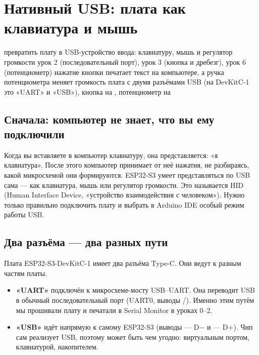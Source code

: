 \section{Нативный USB: плата как клавиатура и мышь}
\lessonintro
  {превратить плату в USB-устройство ввода: клавиатуру, мышь и регулятор громкости}
  {урок 2 (последовательный порт), урок 3 (кнопка и дребезг), урок 6 (потенциометр)}
  {нажатие кнопки печатает текст на компьютере, а ручка потенциометра меняет громкость}
  {плата с двумя разъёмами USB (на DevKitC-1 это «UART» и «USB»), кнопка на , потенциометр на }

\subsection{Сначала: компьютер не знает, что вы ему подключили}

Когда вы вставляете в компьютер клавиатуру, она представляется: «я клавиатура». После этого компьютер
принимает от неё нажатия, не разбираясь, какой микросхемой они формируются. ESP32-S3 умеет представляться
по USB сама --- как клавиатура, мышь или регулятор громкости. Это называется HID (Human Interface
Device, «устройство взаимодействия с человеком»). Нужно только правильно подключить плату и выбрать
в Arduino IDE особый режим работы USB.

\subsection{Два разъёма --- два разных пути}

Плата ESP32-S3-DevKitC-1 имеет два разъёма Type-C. Они ведут к разным частям платы.

\begin{itemize}[leftmargin=*]
  \item \textbf{«UART»} подключён к микросхеме-мосту USB--UART. Она переводит USB в обычный последовательный порт
        (UART0, выводы /). Именно этим путём мы прошивали плату и печатали в Serial Monitor
        в уроках 0--2.
  \item \textbf{«USB»} идёт напрямую к самому ESP32-S3 (выводы  --- D$-$ и  --- D$+$). Чип
        сам реализует USB, поэтому может быть чем угодно: виртуальным портом, клавиатурой, накопителем.
\end{itemize}


